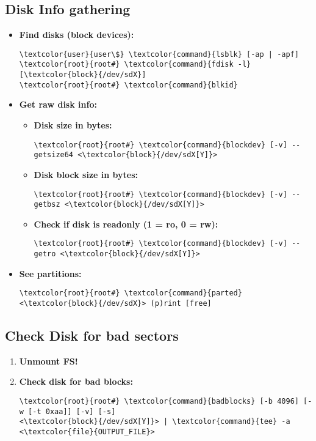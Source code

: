 \documentclass[10pt, a4paper, onecolumn, openany]{book} %
\begin{document}
\subsection{Disk Info gathering}
\label{disk_info_gathering}
\begin{itemize}
    \item \textbf{Find disks (block devices):}
\begin{Verbatim}[commandchars=\\\{\}]
\textcolor{user}{user\$} \textcolor{command}{lsblk} [-ap | -apf]
\textcolor{root}{root#} \textcolor{command}{fdisk -l} [\textcolor{block}{/dev/sdX}]
\textcolor{root}{root#} \textcolor{command}{blkid}
\end{Verbatim}
    \item \textbf{Get raw disk info:}
    \begin{itemize}
        \item \textbf{Disk size in bytes:}
\begin{Verbatim}[commandchars=\\\{\}]
\textcolor{root}{root#} \textcolor{command}{blockdev} [-v] --getsize64 <\textcolor{block}{/dev/sdX[Y]}>
\end{Verbatim}        
    \item \textbf{Disk block size in bytes:}
\begin{Verbatim}[commandchars=\\\{\}]
\textcolor{root}{root#} \textcolor{command}{blockdev} [-v] --getbsz <\textcolor{block}{/dev/sdX[Y]}>
\end{Verbatim}
    \item \textbf{Check if disk is readonly (1 = ro, 0 = rw):}
\begin{Verbatim}[commandchars=\\\{\}]
\textcolor{root}{root#} \textcolor{command}{blockdev} [-v] --getro <\textcolor{block}{/dev/sdX[Y]}>
\end{Verbatim}
    \end{itemize}
    \item \textbf{See partitions:}
\begin{Verbatim}[commandchars=\\\{\}]
\textcolor{root}{root#} \textcolor{command}{parted} <\textcolor{block}{/dev/sdX}> (p)rint [free]
\end{Verbatim}
\end{itemize}
\subsection{Check Disk for bad sectors}
\begin{enumerate}
    \item \textbf{Unmount FS!}
    \item \textbf{Check disk for bad blocks:}
\begin{Verbatim}[commandchars=\\\{\}]
\textcolor{root}{root#} \textcolor{command}{badblocks} [-b 4096] [-w [-t 0xaa]] [-v] [-s] 
<\textcolor{block}{/dev/sdX[Y]}> | \textcolor{command}{tee} -a <\textcolor{file}{OUTPUT_FILE}>
\end{Verbatim}
\end{enumerate}
\end{document}
